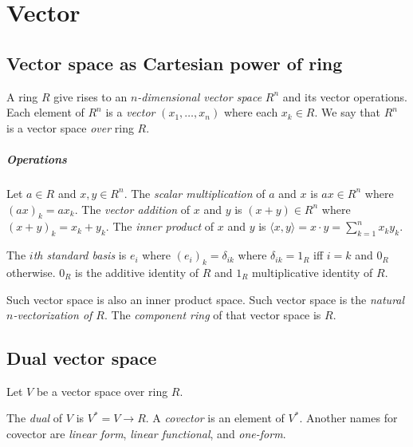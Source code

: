 \chapter{Vector}

\section{Vector space as Cartesian power of ring}

A ring \(R\) give rises to an
%
\emph{\(n\)-dimensional vector space} \(R^n\) and its vector operations.
Each element of \(R^n\) is a
%
\emph{vector} \((x_1,\ldots,x_n)\)
where each \(x_k \in R\).
We say that \(R^n\) is a vector space \emph{over} ring \(R\).

\paragraph{Operations}
Let \(a \in R\) and \(x,y\in R^n\).
The
%
%
%
\emph{scalar multiplication} of \(a\) and \(x\) is \(ax \in R^n\) where \((ax)_k = a x_k\).
The
%
%
\emph{vector addition} of \(x\) and \(y\) is \((x+y) \in R^n\) where \((x+y)_k = x_k+y_k\).
The
%
%
\emph{inner product} of \(x\) and \(y\) is \(\langle x,y \rangle = x \cdot y = \sum_{k=1}^n x_k y_k\).

The \emph{\(i\)th standard basis} is \(e_i\) where \((e_i)_k = \delta_{ik}\)
where \(\delta_{ik} = 1_R\) iff \(i=k\) and \(0_R\) otherwise.
\(0_R\) is the additive identity of \(R\)
and \(1_R\) multiplicative identity of \(R\).

Such vector space is also an inner product space.
Such vector space is the \emph{natural \(n\)-vectorization of \(R\)}.
The \emph{component ring} of that vector space is \(R\).

\section{Dual vector space}

Let \(V\) be a vector space over ring \(R\).

The
%
%
\emph{dual} of \(V\) is \(V^* = V \to R\).
A
%
\emph{covector} is an element of \(V^*\).
Another names for covector are
\emph{linear form}, \emph{linear functional}, and \emph{one-form}.

